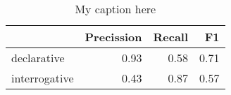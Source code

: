 \begin{table}[!ht]
\centering
\begin{tabular}{lrrr}
\toprule
{} &  Precission &  Recall &   F1 \\
\midrule
declarative   &        0.93 &    0.58 & 0.71 \\
interrogative &        0.43 &    0.87 & 0.57 \\
\bottomrule
\end{tabular}
\caption{My caption here}
\label{tab:INDICATIVE-ocd-combined-F1}
\end{table}